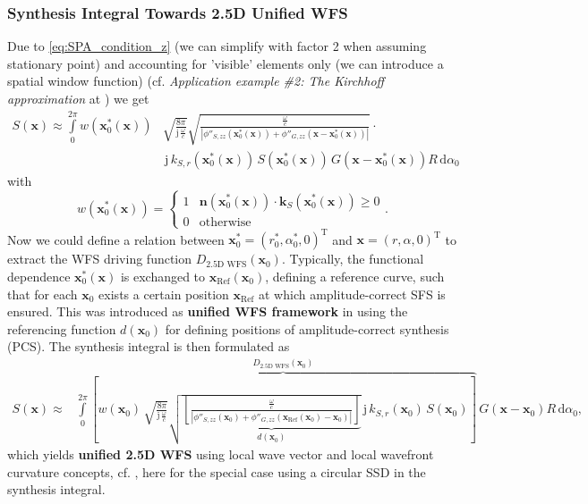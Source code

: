 \documentclass[a4paper,BCOR=15mm,10pt,twoside]{scrartcl}
\newcommand\im{\mathrm{j}}  %
\newcommand\fsd{\mathrm{d}}  %
\newcommand\wc{\frac{\omega}{c}}  %
\newcommand\jwc{\im\,\frac{\omega}{c}}  %
\newcommand\azx{\alpha}  %
\renewcommand{\vec}[1]{\mathbf{#1}}  %
\newcommand\unitn{\vec{n}}  %
\begin{document}
\subsubsection{Synthesis Integral Towards 2.5D Unified WFS}
Due to \eqref{eq:SPA_condition_z} (we can simplify with factor 2 when assuming stationary point) and accounting for 'visible' elements only (we can introduce a spatial window function) (cf. \textit{Application example \#2: The Kirchhoff approximation} at \cite[p.46]{Firtha2018Diss}) we get
%
\begin{align}
\label{eq:HIE_FAR1_SPA7}
S(\vec{x}) \approx \int\limits_{0}^{2\pi} 
w(\vec{x}_0^*(\vec{x})) & \sqrt{\frac{8\pi}{\jwc}}
\sqrt{\frac{\wc}{|\phi''_{S,zz}(\vec{x}_0^*(\vec{x}))+\phi''_{G,zz}(\vec{x}-\vec{x}_0^*(\vec{x}))|}} \cdot \nonumber\\
& \,\im \, k_{S,r}(\vec{x}_0^*(\vec{x})) \,
S(\vec{x}_0^*(\vec{x}))\,G(\vec{x}-\vec{x}_0^*(\vec{x}))
R \, \fsd \azx_0
\end{align}
%
with
%
\begin{equation}\label{eq:as}
w(\vec{x}_0^*(\vec{x})) =
    \begin{cases}
      1 & 
       \unitn(\vec{x}_0^*(\vec{x})) \cdot \vec{k}_S(\vec{x}_0^*(\vec{x})) \geq 0 \\
      0 & \text{otherwise}
    \end{cases}.
\end{equation}
%
Now we could define a relation between $\vec{x}_0^*=(r_0^*,\azx_0^*,0)^\mathrm{T}$ and $\vec{x}=(r,\azx,0)^\mathrm{T}$ to extract the WFS driving function $D_\text{2.5D WFS}(\vec{x}_0)$.
Typically, the functional dependence $\vec{x}_0^*(\vec{x})$ is exchanged to $\vec{x}_\text{Ref}(\vec{x}_0)$, defining a reference curve, such that for each $\vec{x}_0$ exists a certain position $\vec{x}_\text{Ref}$ at which amplitude-correct SFS is ensured.
This was introduced as \textbf{unified WFS framework} in \cite[Sec. IIIB]{Firtha2017} using the referencing function $d(\vec{x}_0)$ for defining positions of amplitude-correct synthesis (PCS).
The synthesis integral is then formulated as
%
\begin{align}
\label{eq:HIE_FAR1_SPA8}
S(\vec{x}) \approx & \int\limits_{0}^{2\pi}
\overbrace{\left[
w(\vec{x}_0)\,\sqrt{\frac{8\pi}{\jwc}}
\sqrt{\underbrace{\left[\frac{\wc}{|\phi''_{S,zz}(\vec{x}_0)+\phi''_{G,zz}(\vec{x}_\text{Ref}(\vec{x}_0)-\vec{x}_0)|}\right]}_{d(\vec{x}_0)}} 
\,\im \, k_{S,r}(\vec{x}_0) \,
S(\vec{x}_0)\right]}^{D_\text{2.5D WFS}(\vec{x}_0)}\,G(\vec{x}-\vec{x}_0)
R \, \fsd \azx_0,
\end{align}
%
which yields \textbf{unified 2.5D WFS} using local wave vector and local wavefront curvature concepts, cf. \cite[Sec. 4.1.3]{Firtha2018Diss}, here for the special case using a circular SSD in the synthesis integral.
\end{document}
